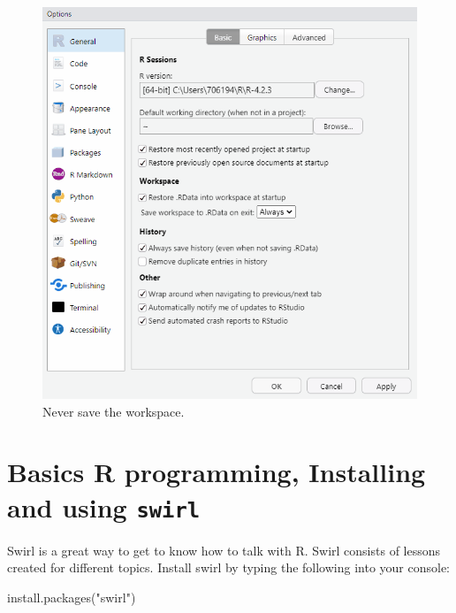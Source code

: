 \documentclass[
  11pt,
  letterpaper,
]{scrbook}
\newenvironment{Shaded}{\begin{snugshade}}{\end{snugshade}}
\newcommand{\FunctionTok}[1]{\textcolor[rgb]{0.28,0.35,0.67}{#1}}
\newcommand{\NormalTok}[1]{\textcolor[rgb]{0.00,0.23,0.31}{#1}}
\newcommand{\StringTok}[1]{\textcolor[rgb]{0.13,0.47,0.30}{#1}}
\begin{document}
\begin{figure}

{\centering \includegraphics{images/ch3/03-ask-workspace.gif}

}

\caption{\label{fig-saveworkspace}Never save the workspace.}

\end{figure}

\hypertarget{basics-r-programming-installing-and-using-swirl}{%
\section{\texorpdfstring{Basics R programming, Installing and using
\texttt{swirl}}{Basics R programming, Installing and using swirl}}\label{basics-r-programming-installing-and-using-swirl}}

Swirl is a great way to get to know how to talk with R. Swirl consists
of lessons created for different topics. Install swirl by typing the
following into your console:

\begin{Shaded}
\begin{Highlighting}[numbers=left,,]
\FunctionTok{install.packages}\NormalTok{(}\StringTok{"swirl"}\NormalTok{)}
\end{Highlighting}
\end{Shaded}
\end{document}
